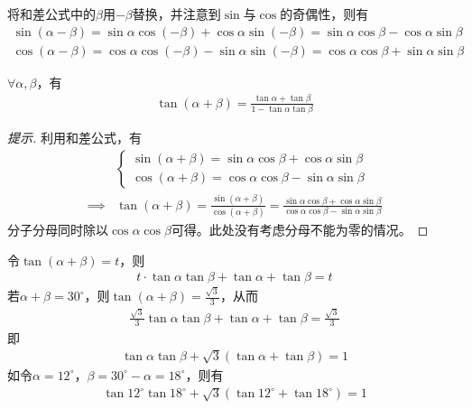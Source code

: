 \begin{example}
  将和差公式中的$\beta$用$-\beta$替换，并注意到$\sin$与$\cos$的奇偶性，则有
  \begin{align*}
    \sin(\alpha-\beta) = \sin\alpha\cos(-\beta) + \cos\alpha\sin(-\beta) = \sin\alpha\cos\beta - \cos\alpha\sin\beta\\
    \cos(\alpha-\beta) = \cos\alpha\cos(-\beta) - \sin\alpha\sin(-\beta) = \cos\alpha\cos\beta + \sin\alpha\sin\beta
  \end{align*}
\end{example}

\begin{theorem}
  $\forall \alpha,\beta$，有
  \begin{align*}
    \tan(\alpha+\beta) = \frac{\tan\alpha+\tan\beta}{1-\tan\alpha\tan\beta}
  \end{align*}
\end{theorem}
\begin{proof}[提示]
  利用和差公式，有
  \begin{align*}
    &\begin{cases}
      \sin(\alpha+\beta) = \sin\alpha\cos\beta + \cos\alpha\sin\beta\\
      \cos(\alpha+\beta) = \cos\alpha\cos\beta - \sin\alpha\sin\beta
    \end{cases}\\
    \implies& \tan(\alpha+\beta)=\frac{\sin(\alpha+\beta)}{\cos(\alpha+\beta)}
              =\frac{\sin\alpha\cos\beta + \cos\alpha\sin\beta}{\cos\alpha\cos\beta - \sin\alpha\sin\beta}
  \end{align*}
  分子分母同时除以$\cos\alpha\cos\beta$可得。此处没有考虑分母不能为零的情况。
\end{proof}

\begin{example}
  令$\tan(\alpha+\beta)=t$，则
  \begin{align*}
    t\cdot\tan\alpha\tan\beta + \tan\alpha + \tan\beta = t
  \end{align*}
  若$\alpha+\beta=30^\circ$，则$\tan(\alpha+\beta) = \frac{\sqrt3}{3}$，从而
  \begin{align*}
    \frac{\sqrt3}{3}\tan\alpha\tan\beta + \tan\alpha + \tan\beta = \frac{\sqrt3}{3}
  \end{align*}
  即
  \begin{align*}
    \tan\alpha\tan\beta + \sqrt3(\tan\alpha + \tan\beta) = 1
  \end{align*}
  如令$\alpha = 12^\circ$，$\beta = 30^\circ - \alpha = 18^\circ$，则有
  \begin{align*}
    \tan12^\circ\tan18^\circ + \sqrt3(\tan12^\circ + \tan18^\circ) = 1
  \end{align*}
\end{example}

